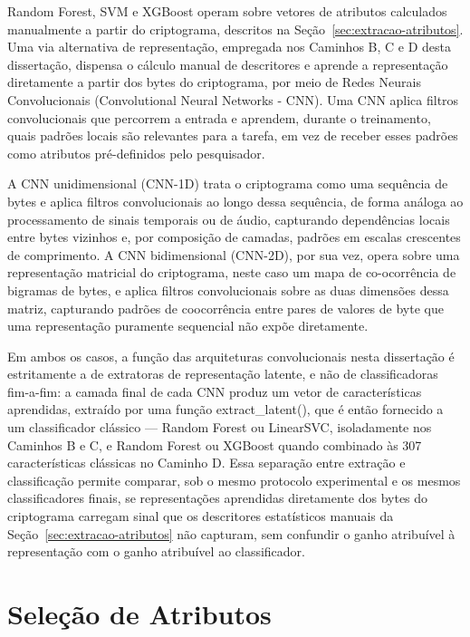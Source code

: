 Random Forest, SVM e XGBoost operam sobre vetores de atributos calculados manualmente a partir do criptograma, descritos na Seção~\ref{sec:extracao-atributos}. Uma via alternativa de representação, empregada nos Caminhos B, C e D desta dissertação, dispensa o cálculo manual de descritores e aprende a representação diretamente a partir dos bytes do criptograma, por meio de Redes Neurais Convolucionais (Convolutional Neural Networks - CNN). Uma CNN aplica filtros convolucionais que percorrem a entrada e aprendem, durante o treinamento, quais padrões locais são relevantes para a tarefa, em vez de receber esses padrões como atributos pré-definidos pelo pesquisador.

A CNN unidimensional (CNN-1D) trata o criptograma como uma sequência de bytes e aplica filtros convolucionais ao longo dessa sequência, de forma análoga ao processamento de sinais temporais ou de áudio, capturando dependências locais entre bytes vizinhos e, por composição de camadas, padrões em escalas crescentes de comprimento. A CNN bidimensional (CNN-2D), por sua vez, opera sobre uma representação matricial do criptograma, neste caso um mapa de co-ocorrência de bigramas de bytes, e aplica filtros convolucionais sobre as duas dimensões dessa matriz, capturando padrões de coocorrência entre pares de valores de byte que uma representação puramente sequencial não expõe diretamente.

Em ambos os casos, a função das arquiteturas convolucionais nesta dissertação é estritamente a de extratoras de representação latente, e não de classificadoras fim-a-fim: a camada final de cada CNN produz um vetor de características aprendidas, extraído por uma função extract\_latent(), que é então fornecido a um classificador clássico --- Random Forest ou LinearSVC, isoladamente nos Caminhos B e C, e Random Forest ou XGBoost quando combinado às 307 características clássicas no Caminho D. Essa separação entre extração e classificação permite comparar, sob o mesmo protocolo experimental e os mesmos classificadores finais, se representações aprendidas diretamente dos bytes do criptograma carregam sinal que os descritores estatísticos manuais da Seção~\ref{sec:extracao-atributos} não capturam, sem confundir o ganho atribuível à representação com o ganho atribuível ao classificador.


\section{Seleção de Atributos}
\label{sec:selecao-atributos}

